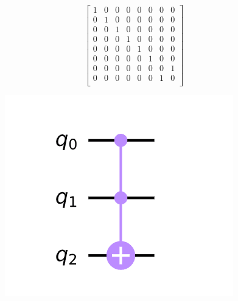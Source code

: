\documentclass[11pt]{article}
\begin{document}
$$\begin{bmatrix}
        1 & 0 & 0 & 0 & 0 & 0 & 0 & 0 \\
        0 & 1 & 0 & 0 & 0 & 0 & 0 & 0 \\
        0 & 0 & 1 & 0 & 0 & 0 & 0 & 0 \\
        0 & 0 & 0 & 1 & 0 & 0 & 0 & 0 \\
        0 & 0 & 0 & 0 & 1 & 0 & 0 & 0 \\
        0 & 0 & 0 & 0 & 0 & 1 & 0 & 0 \\
        0 & 0 & 0 & 0 & 0 & 0 & 0 & 1 \\
        0 & 0 & 0 & 0 & 0 & 0 & 1 & 0 \\
    \end{bmatrix}$$

\begin{figure}[H]
    \includegraphics[scale=.7]{toffoli_scheme}
    \centering
\end{figure}
\end{document}
